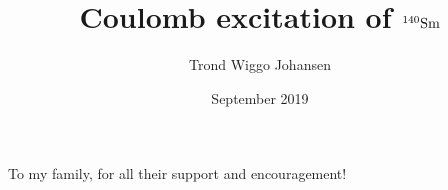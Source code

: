 \documentclass[twoside,english]{uiofysmaster/uiofysmaster}
\author{Trond Wiggo Johansen}
\title{Coulomb excitation of $\textnormal{$^{140}$Sm}$}
\date{September 2019}
\begin{document}
\setlength{\belowdisplayskip}{12pt} \setlength{\belowdisplayshortskip}{12pt}
\setlength{\abovedisplayskip}{12pt} \setlength{\abovedisplayshortskip}{12pt}

\maketitle


\begin{abstract}


\end{abstract}


\begin{dedication}
To my family, for all their support and encouragement!

\end{dedication}
\end{document}
